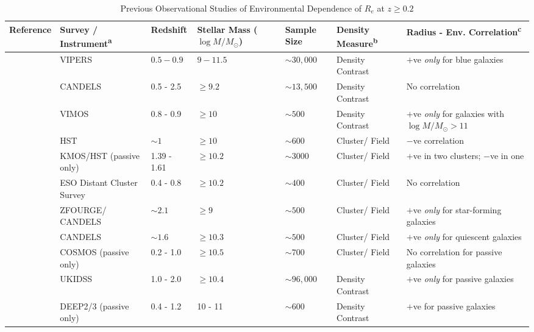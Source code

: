 \begin{table}[htbp]
    \small
    \centering
    \caption{Previous Observational Studies of Environmental Dependence of $R_e$ at $z \geq 0.2$\label{tab_c4:lit_survey}}
    \begin{tabular}{P{2cm}P{2cm}P{1.4cm}P{1.5cm}P{1.5cm}P{1.25cm}P{2.3cm}}
    \hline
    \hline
    Reference & Survey / Instrument\textsuperscript{a} & Redshift  & Stellar Mass ($\log M / M_{\odot}$) & Sample Size & Density Measure\textsuperscript{b} & Radius - Env. Correlation\textsuperscript{c}\\
    \hline
    \hline
   \citet{Siudek22} & VIPERS & $0.5 - 0.9$ & $9 - 11.5$ & $\sim 30,000$ & Density Contrast & $+$ve \textit{only} for blue galaxies \\
    \hline
    \citet{Gu21} & CANDELS & 0.5 - 2.5 & $\geq 9.2$ & $\sim13,500$ & Density Contrast & No correlation \\
    \hline
    \citet{Afonso19} & VIMOS & 0.8 - 0.9 & $\geq 10$ & $\sim 500$ & Density Contrast & $+$ve \textit{only} for galaxies with $\log M/M_{\odot} > 11$ \\
    \hline
    \citet{Matharu19} & HST & $\sim1$ & $\geq10$ & $\sim600$ & Cluster/ Field & $-$ve correlation \\
    \hline
    \citet{Chan18} & KMOS/HST (passive only) & 1.39 - 1.61 & $\geq10.2$ & $\sim3000$& Cluster/ Field & $+$ve in two clusters; $-$ve in one\\
    \hline
    \citet{Kelkar15} & ESO Distant Cluster Survey & 0.4 - 0.8 & $\geq 10.2$ & $\sim400$ & Cluster/ Field & No correlation\\
    \hline
    \citet{Allen15} & ZFOURGE/ CANDELS & $\sim2.1$ & $\geq 9$ & $\sim500$ & Cluster/ Field & $+$ve \textit{only} for star-forming galaxies\\ 
    \hline
    \citet{Bassett13} & CANDELS & $\sim1.6$ & $ \geq 10.3$ & $\sim 500$ & Cluster/ Field & $+$ve \textit{only} for quiescent galaxies\\
    \hline
    \citet{Huertas-Company13}  &  COSMOS (passive only) & 0.2 - 1.0 & $\geq 10.5$ & $\sim700$ & Cluster/ Field & No correlation for passive galaxies\\
    \hline
    \citet{Lani13} & UKIDSS & 1.0 - 2.0 & $\geq 10.4$ & $\sim96,000$ & Density Contrast & $+$ve \textit{only} for passive galaxies\\
    \hline
    \citet{Cooper12} & DEEP2/3 (passive only) & 0.4 - 1.2 & 10 - 11 & $\sim600$ & Density Contrast & $+$ve for passive galaxies\\

\end{tabular}
\end{table}
